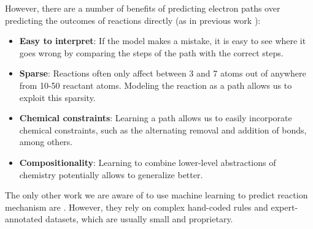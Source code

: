 However, there are a number of benefits of predicting electron paths over predicting the outcomes of reactions directly (as in previous work \cite{jin2017predicting,schwaller2017found}):
\begin{itemize}
\item \textbf{Easy to interpret}: If the model makes a mistake, it is easy to see where it goes wrong by comparing the steps of the path with the correct steps.
\vspace{-0.1cm}
\item \textbf{Sparse}: Reactions often only affect between 3 and 7 atoms out of anywhere from 10-50 reactant atoms. Modeling the reaction as a path allows us to exploit this sparsity.
\vspace{-0.1cm}
\item \textbf{Chemical constraints}: Learning a path allows us to easily incorporate chemical constraints, such as the alternating removal and addition of bonds, among others.
\vspace{-0.1cm}
\item \textbf{Compositionality}: Learning to combine lower-level abstractions of chemistry potentially allows to generalize better.
\vspace{-0.1cm}
\end{itemize}
The only other work we are aware of to use machine learning to predict reaction mechanism are \cite{kayala2011learning,kayala2012reactionpredictor}. 
However,
they rely on complex hand-coded rules and expert-annotated datasets, which are usually small and proprietary.

